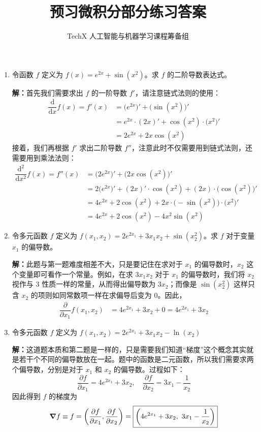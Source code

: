 \documentclass[11pt]{ctexart}
\title{预习微积分部分练习答案}
\author{TechX 人工智能与机器学习课程筹备组}
\date{}
\let\grad\relax
\DeclareMathOperator{\grad}{\mathrm{grad}}
\begin{document}
\maketitle

\begin{enumerate}
  \item 令函数 $f$ 定义为 $f(x) = e^{2x} + \sin(x^2)$。求 $f$ 的二阶导数表达式。\par
    \textbf{解：}首先我们需要求出 $f$ 的一阶导数 $f'$，请注意链式法则的使用：
    \begin{align*}
      \dfrac{\mathrm{d}}{\mathrm{d}x} f(x) =
      f'(x) &= \big(e^{2x}\big)' + \big(\sin(x^2)\big)' \\
            &= e^{2x} \cdot (2x)' + \cos(x^2) \cdot \big(x^2\big)' \\
            &= 2e^{2x} + 2x\cos(x^2)
    \end{align*}
    接着，我们再根据 $f'$ 求出二阶导数 $f''$，注意此时不仅需要用到链式法则，还需要用到乘法法则：
    \begin{align*}
      \dfrac{\mathrm{d^2}}{\mathrm{d}x^2} f(x) =
      f''(x) &= \big(2e^{2x}\big)' + \big(2x \cos(x^2)\big)' \\
             &= 2\big(e^{2x}\big)' + (2x)' \cdot \cos(x^2) + (2x) \cdot \big(\cos(x^2)\big)' \\
             &= 4e^{2x} + 2\cos(x^2) + 2x \cdot \big(-\sin(x^2)\big) \cdot \big(x^2\big)' \\
             &= \boxed{4e^{2x} + 2\cos(x^2) - 4x^2 \sin(x^2)}
    \end{align*}
  
  \item 令多元函数 $f$ 定义为 $f(x_1, x_2) = 2e^{2x_1} + 3x_1 x_2 + \sin(x_2^2)$。求 $f$ 对于变量 $x_1$ 的偏导数。\par
    \textbf{解：}此题与第一题难度相差不大，只是要记住在求对于 $x_1$ 的偏导数时，$x_2$ 这个变量即可看作一个常量。例如，在求 $3x_1 x_2$ 对于 $x_1$ 的偏导数时，我们将 $x_2$ 视作与 $3$ 性质一样的常量，从而得出偏导数为 $3x_2$；而像是 $\sin(x_2^2)$ 这样只含 $x_2$ 的项则如同常数项一样在求偏导后变为 0。因此，
    \begin{align*}
      \dfrac{\partial}{\partial x_1} f(x_1, x_2) &= 4e^{2x_1} + 3x_2 + 0 = \boxed{4e^{2x_1} + 3x_2}
    \end{align*}
  
  \item 令多元函数 $f$ 定义为 $f(x_1, x_2) = 2e^{2x_1} + 3x_1 x_2 - \ln(x_2)$ \par
    \textbf{解：}这道题本质和第二题是一样的，只是需要我们知道“梯度”这个概念其实就是若干个不同的偏导数放在一起。题中的函数是二元函数，所以我们需要求两个偏导数，分别是对于 $x_1$ 和 $x_2$ 的偏导数。过程如下：
    \[
      \dfrac{\partial f}{\partial x_1} = 4e^{2x_1} + 3x_2, \quad \dfrac{\partial f}{\partial x_2} = 3x_1 - \frac{1}{x_2}
    \]
    因此得到 $f$ 的梯度为
    \[
      \gradient f \equiv \grad f = \left( \dfrac{\partial f}{\partial x_1}, \dfrac{\partial f}{\partial x_2} \right) = \boxed{\left( 4e^{2x_1} + 3x_2,\ 3x_1 - \frac{1}{x_2} \right)}
    \]

\end{enumerate}
\end{document}
